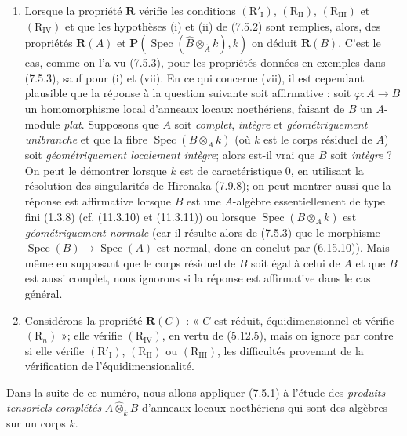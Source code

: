 \begin{remarks}[7.5.4]
\begin{enumerate}
\item[(iii)] Lorsque la propriété $\boldsymbol R$ vérifie les conditions
$(\mathrm R'_{\mathrm I})$, $(\mathrm R_{\mathrm{II}})$,
$(\mathrm R_{\mathrm{III}})$ et $(\mathrm R_{\mathrm{IV}})$ et que les
hypothèses (i) et (ii) de (7.5.2) sont remplies, alors, des propriétés
$\boldsymbol R(A)$ et
$\boldsymbol P(\operatorname{Spec}(\widehat B
\otimes_{\widehat A}k),k)$
on déduit $\boldsymbol R(B)$. C'est le cas, comme on l'a vu (7.5.3), pour les
propriétés données en exemples dans (7.5.3), sauf pour (i) et (vii). En ce qui
concerne (vii), il est cependant plausible que la réponse à la question
suivante soit affirmative : soit $\varphi:A\to B$ un homomorphisme local
d'anneaux locaux noethériens, faisant de $B$ un $A$-module \emph{plat}. Supposons que
$A$ soit \emph{complet}, \emph{intègre} et \emph{géométriquement unibranche} et que la fibre
$\operatorname{Spec}(B\otimes_A k)$ (où $k$ est le corps résiduel de $A$) soit
\emph{géométriquement localement intègre}; alors est-il vrai que $B$ soit \emph{intègre} ?
On peut le démontrer lorsque $k$ est de caractéristique 0, en utilisant la
résolution des singularités de Hironaka (7.9.8); on peut montrer aussi que la
réponse est affirmative lorsque $B$ est une $A$-algèbre essentiellement de
type fini (1.3.8) (cf. (11.3.10) et (11.3.11)) ou lorsque
$\operatorname{Spec}(B\otimes_A k)$ est \emph{géométriquement normale} (car il résulte
alors de (7.5.3) que le morphisme
$\operatorname{Spec}(B)\to\operatorname{Spec}(A)$ est normal, donc on conclut
par (6.15.10)). Mais même en supposant que le corps résiduel de $B$ soit égal
à celui de $A$ et que $B$ est aussi complet, nous ignorons si la réponse est
affirmative dans le cas général.

\item[(iv)] Considérons la propriété $\boldsymbol R(C)$ : « $C$ est
réduit, équidimensionnel et vérifie $(\mathrm R_n)$ »; elle vérifie
$(\mathrm R_{\mathrm{IV}})$, en vertu de (5.12.5), mais on ignore par contre si
elle vérifie $(\mathrm R'_{\mathrm I})$, $(\mathrm R_{\mathrm{II}})$ ou
$(\mathrm R_{\mathrm{III}})$, les difficultés provenant de la vérification de
l'équidimensionalité.
\end{enumerate}
\end{remarks}


Dans la suite de ce numéro, nous allons appliquer (7.5.1) à l'étude des
\emph{produits tensoriels complétés} $A\widehat\otimes_k B$ d'anneaux locaux
noethériens qui sont des algèbres sur un corps $k$.

